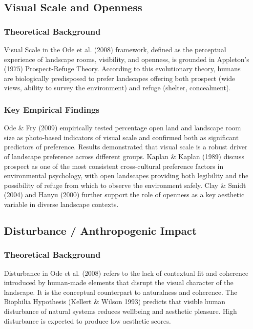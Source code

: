 \documentclass[hidelinks, 11pt]{article}
\begin{document}
\subsection{Visual Scale and Openness}\label{sec:VSO}
\subsubsection{Theoretical Background}
Visual Scale in the Ode et al. (2008) framework, defined as the perceptual experience of landscape rooms, visibility, and openness, is grounded in Appleton's (1975) Prospect-Refuge Theory. According to this evolutionary theory, humans are biologically predisposed to prefer landscapes offering both prospect (wide views, ability to survey the environment) and refuge (shelter, concealment). 
\subsubsection{Key Empirical Findings}
Ode \& Fry (2009) empirically tested percentage open land and landscape room size as photo-based indicators of visual scale and confirmed both as significant predictors of preference. Results demonstrated that visual scale is a robust driver of landscape preference across different groups.
Kaplan \& Kaplan (1989) discuss prospect as one of the most consistent cross-cultural preference factors in environmental psychology, with open landscapes providing both legibility and the possibility of refuge from which to observe the environment safely.
Clay \& Smidt (2004) and Hanyu (2000) further support the role of openness as a key aesthetic variable in diverse landscape contexts.

\subsection{Disturbance / Anthropogenic Impact}\label{sec:DAI}
\subsubsection{Theoretical Background}
Disturbance in Ode et al. (2008) refers to the lack of contextual fit and coherence introduced by human-made elements that disrupt the visual character of the landscape. It is the conceptual counterpart to naturalness and coherence. The Biophilia Hypothesis (Kellert & Wilson 1993) predicts that visible human disturbance of natural systems reduces wellbeing and aesthetic pleasure. High disturbance is expected to produce low aesthetic scores.
\end{document}
